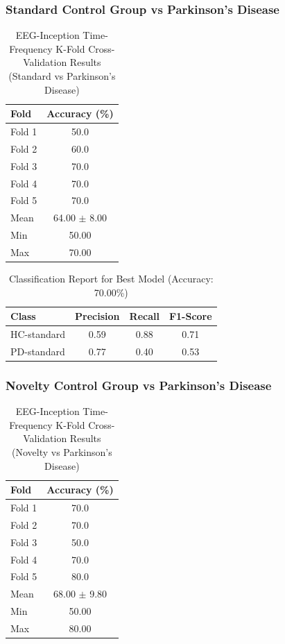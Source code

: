 \documentclass[12pt]{report}
\begin{document}
\subsubsection{Standard Control Group vs Parkinson's Disease}

\begin{table}[h]
\centering
\caption{EEG-Inception Time-Frequency K-Fold Cross-Validation Results (Standard vs Parkinson's Disease)}
\begin{tabular}{lc}
\hline
\textbf{Fold} & \textbf{Accuracy (\%)} \\
\hline
Fold 1 & 50.0 \\
Fold 2 & 60.0 \\
Fold 3 & 70.0 \\
Fold 4 & 70.0 \\
Fold 5 & 70.0 \\
\hline
Mean & 64.00 $\pm$ 8.00 \\
Min & 50.00 \\
Max & 70.00 \\
\hline
\end{tabular}
\end{table}

\begin{table}[h]
\centering
\caption{Classification Report for Best Model (Accuracy: 70.00\%)}
\begin{tabular}{lccc}
\hline
\textbf{Class} & \textbf{Precision} & \textbf{Recall} & \textbf{F1-Score} \\
\hline
HC-standard & 0.59 & 0.88 & 0.71 \\
PD-standard & 0.77 & 0.40 & 0.53 \\
\hline
\end{tabular}
\end{table}

\clearpage

\subsubsection{Novelty Control Group vs Parkinson's Disease}

\begin{table}[h]
\centering
\caption{EEG-Inception Time-Frequency K-Fold Cross-Validation Results (Novelty vs Parkinson's Disease)}
\begin{tabular}{lc}
\hline
\textbf{Fold} & \textbf{Accuracy (\%)} \\
\hline
Fold 1 & 70.0 \\
Fold 2 & 70.0 \\
Fold 3 & 50.0 \\
Fold 4 & 70.0 \\
Fold 5 & 80.0 \\
\hline
Mean & 68.00 $\pm$ 9.80 \\
Min & 50.00 \\
Max & 80.00 \\
\hline
\end{tabular}
\end{table}
\end{document}
